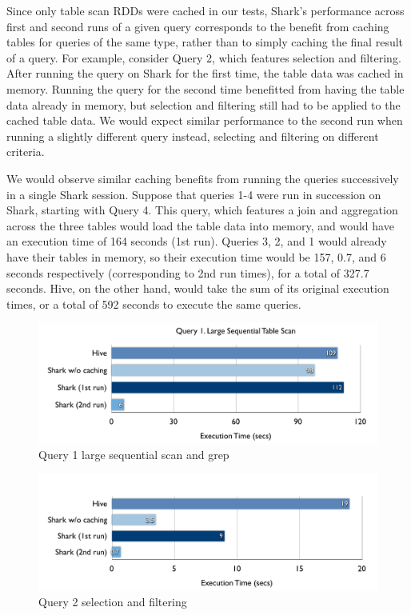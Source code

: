 Since only table scan RDDs were cached in our tests, Shark's performance across first and second runs of a given query corresponds to the benefit from caching tables for queries of the same type, rather than to simply caching the final result of a query. For example, consider Query 2, which features selection and filtering. After running the query on Shark for the first time, the table data was cached in memory. Running the query for the second time benefitted from having the table data already in memory, but selection and filtering still had to be applied to the cached table data. We would expect similar performance to the second run when running a slightly different query instead, \eg selecting and filtering on different criteria. 

We would observe similar caching benefits from running the queries successively in a single Shark session. Suppose that queries 1-4 were run in succession on Shark, starting with Query 4. This query, which features a join and aggregation across the three tables would load the table data into memory, and would have an execution time of 164 seconds (1st run). Queries 3, 2, and 1 would already have their tables in memory, so their execution time would be 157, 0.7, and 6 seconds respectively (corresponding to 2nd run times), for a total of 327.7 seconds. Hive, on the other hand, would take the sum of its original execution times, or a total of 592 seconds to execute the same queries.



\begin{figure}
	\centering
	\includegraphics[width=\linewidth]{files/query1.pdf}
	\caption{Query 1 large sequential scan and grep}
	\label{fig:query1}
\end{figure}

\begin{figure}
	\centering
	\includegraphics[width=\linewidth]{files/query2.pdf}
	\caption{Query 2 selection and filtering}
	\label{fig:query2}
\end{figure}

